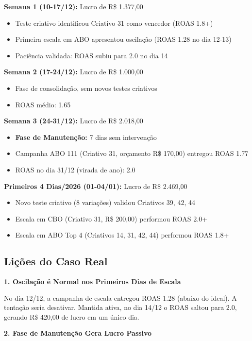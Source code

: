 \documentclass[12pt, a4paper]{article}
\newcommand{\reais}[1]{R\$ #1}
\begin{document}
\textbf{Semana 1 (10-17/12):} Lucro de \reais{1.377,00}
\begin{itemize}
    \item Teste criativo identificou Criativo 31 como vencedor (ROAS 1.8+)
    \item Primeira escala em ABO apresentou oscilação (ROAS 1.28 no dia 12-13)
    \item Paciência validada: ROAS subiu para 2.0 no dia 14
\end{itemize}

\textbf{Semana 2 (17-24/12):} Lucro de \reais{1.000,00}
\begin{itemize}
    \item Fase de consolidação, sem novos testes criativos
    \item ROAS médio: 1.65
\end{itemize}

\textbf{Semana 3 (24-31/12):} Lucro de \reais{2.018,00}
\begin{itemize}
    \item \textbf{Fase de Manutenção:} 7 dias sem intervenção
    \item Campanha ABO 111 (Criativo 31, orçamento \reais{170,00}) entregou ROAS 1.77
    \item ROAS no dia 31/12 (virada de ano): 2.0
\end{itemize}

\textbf{Primeiros 4 Dias/2026 (01-04/01):} Lucro de \reais{2.469,00}
\begin{itemize}
    \item Novo teste criativo (8 variações) validou Criativos 39, 42, 44
    \item Escala em CBO (Criativo 31, \reais{200,00}) performou ROAS 2.0+
    \item Escala em ABO Top 4 (Criativos 14, 31, 42, 44) performou ROAS 1.8+
\end{itemize}

\subsection{Lições do Caso Real}

\textbf{1. Oscilação é Normal nos Primeiros Dias de Escala}

No dia 12/12, a campanha de escala entregou ROAS 1.28 (abaixo do ideal). A tentação seria desativar. Mantida ativa, no dia 14/12 o ROAS saltou para 2.0, gerando \reais{420,00} de lucro em um único dia.

\textbf{2. Fase de Manutenção Gera Lucro Passivo}
\end{document}
